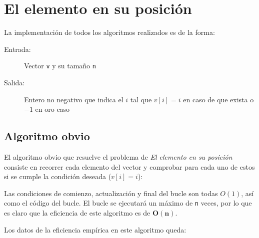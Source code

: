 \section{El elemento en su posición}

La implementación de todos los algoritmos realizados es de la forma:
\begin{description}
 \item[Entrada:] Vector \texttt{v} y su tamaño \texttt{n}
 \item[Salida:] Entero no negativo que indica el $i$ tal que $v[i]=i$ en caso de que exista o $-1$ en oro caso
\end{description}

\subsection{Algoritmo obvio}

El algoritmo obvio que resuelve el problema de \textit{El elemento en su posición} consiste
en recorrer cada elemento del vector y comprobar para cada uno de estos si se cumple la
condición deseada ($v[i] = i$):



Las condiciones de comienzo, actualización y final del bucle son todas $O(1)$, así como el código del bucle. El bucle se ejecutará un máximo de \texttt{n} veces, por lo que es claro que la eficiencia de este algoritmo es de $\mathbf{O(n)}$.

Los datos de la eficiencia empírica en este algoritmo queda:




